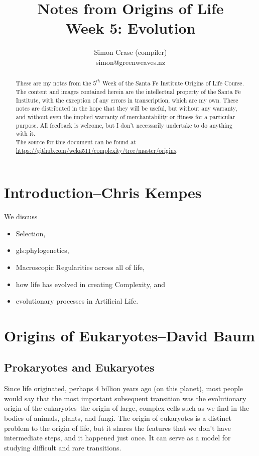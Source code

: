 \documentclass[]{article}
\title{
	Notes from Origins of Life\\
	Week 5: Evolution}
\author{Simon Crase (compiler)\\simon@greenweaves.nz}
\begin{document}
\maketitle

\begin{abstract}
   These are my notes from the $5^{th}$ Week of the Santa Fe Institute Origins of Life Course\cite{sfi2020}. 
   The content and images contained herein are the intellectual property of the Santa Fe Institute, with the exception of any errors in transcription, which are my own. These notes are distributed in the hope that they will be useful,  but without any warranty, and without even the implied warranty of merchantability or fitness for a particular purpose. All feedback is welcome,  but I don't necessarily undertake to do anything with it.\\
   The source for this document can be found at\\
   \url{https://github.com/weka511/complexity/tree/master/origins}.
\end{abstract}

\setcounter{tocdepth}{2}
\tableofcontents
\listoffigures

\section[Introduction]{Introduction--Chris Kempes}

We discuss \begin{itemize}
	\item Selection,
	\item \gls{gls:phylogenetics},
	\item  Macroscopic Regularities across all of life,
	\item how  life has evolved in creating Complexity, and 
	\item evolutionary processes in Artificial Life. 
\end{itemize}

\section[Origins of Eukaryotes]{Origins of Eukaryotes--David Baum}

\subsection{Prokaryotes and Eukaryotes}

Since life originated, perhaps 4 billion years ago (on this planet), most people would say that the most important subsequent transition was the evolutionary origin of the eukaryotes--the origin of large, complex cells such as we find in the bodies of animals, plants, and fungi. The origin of eukaryotes is a distinct problem to the origin of life, but it shares the features that we don't have intermediate steps, and it happened just once. It can serve as a model for studying difficult and rare transitions.
\end{document}
